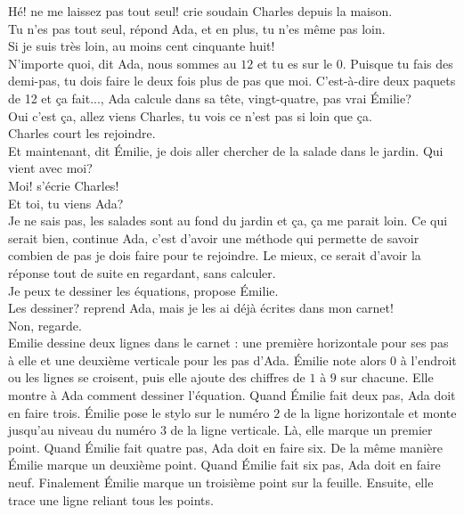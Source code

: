 \mdash Hé! ne me laissez pas tout seul! crie soudain Charles depuis la maison.\\
\mdash Tu n’es pas tout seul, répond Ada, et en plus, tu n'es même pas loin.\\
\mdash Si je suis très loin, au moins cent cinquante huit!\\
\mdash N'importe quoi, dit Ada, nous sommes au $12$ et tu es sur le $0$. Puisque tu fais des demi-pas, tu dois faire le deux fois plus de pas que moi. C'est-à-dire deux paquets de 12 et ça fait..., Ada calcule dans sa tête, vingt-quatre, pas vrai Émilie?\\
\mdash Oui c'est ça, allez viens Charles, tu vois ce n’est pas si loin que ça.\guillemotright\\
Charles court les rejoindre.\\ 
\guillemotleft Et maintenant, dit Émilie, je dois aller chercher de la salade dans le jardin. Qui vient avec moi?\\
\mdash Moi! s'écrie Charles!\\
\mdash Et toi, tu viens Ada?\\
\mdash Je ne sais pas, les salades sont au fond du jardin et ça, ça me parait loin. Ce qui serait bien, continue Ada, c’est d'avoir une méthode qui permette de savoir combien de pas je dois faire pour te rejoindre. Le mieux, ce serait d'avoir la réponse tout de suite en regardant, sans calculer.\\
\mdash Je peux te dessiner les équations, propose Émilie.\\
\mdash Les dessiner? reprend Ada, mais je les ai déjà écrites dans mon carnet!\\
\mdash Non, regarde.\guillemotright\\
Emilie dessine deux lignes dans le carnet : une première horizontale pour ses pas à elle et une deuxième verticale pour les pas d’Ada. Émilie note alors $0$ à l’endroit ou les lignes se croisent, puis elle ajoute des chiffres de $1$ à $9$ sur chacune. Elle montre à Ada comment dessiner l'équation. Quand Émilie fait deux pas, Ada doit en faire trois. Émilie pose le stylo sur le numéro $2$ de la ligne horizontale et monte jusqu'au niveau du numéro $3$ de la ligne verticale. Là, elle marque un premier point. Quand Émilie fait quatre pas, Ada doit en faire six. De la même manière Émilie marque un deuxième point. Quand Émilie fait six pas, Ada doit en faire neuf. Finalement Émilie marque un troisième point sur la feuille. Ensuite, elle trace une ligne reliant tous les points.\\
